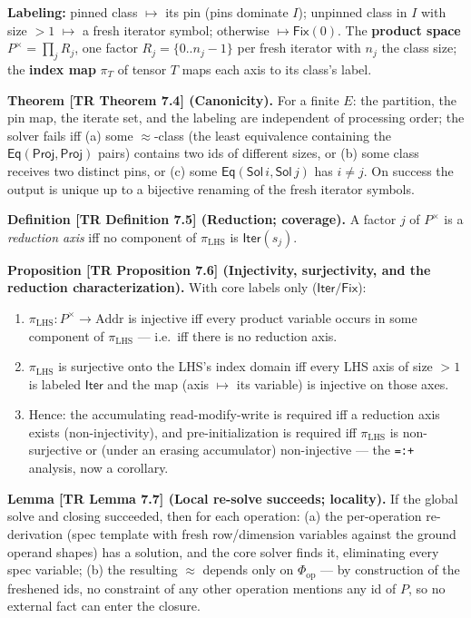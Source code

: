 \documentclass[
  10pt,
  letterpaper,
]{article}
\newcommand{\passthrough}[1]{#1}
\begin{document}
\textbf{Labeling:} pinned class \(\mapsto\) its pin (pins dominate
\(I\)); unpinned class in \(I\) with size \(> 1\) \(\mapsto\) a fresh
iterator symbol; otherwise \(\mapsto \mathsf{Fix}(0)\). The
\textbf{product space} \(P^{\times} = \prod_j R_j\), one factor
\(R_j = \{0..n_j{-}1\}\) per fresh iterator with \(n_j\) the class size;
the \textbf{index map} \(\pi_T\) of tensor \(T\) maps each axis to its
class's label.

\textbf{Theorem {[}TR Theorem 7.4{]} (Canonicity).} For a finite \(E\):
the partition, the pin map, the iterate set, and the labeling are
independent of processing order; the solver fails iff (a) some
\(\approx\)-class (the least equivalence containing the
\(\mathsf{Eq}(\mathsf{Proj},\mathsf{Proj})\) pairs) contains two ids of
different sizes, or (b) some class receives two distinct pins, or (c)
some \(\mathsf{Eq}(\mathsf{Sol}\,i, \mathsf{Sol}\,j)\) has \(i \ne j\).
On success the output is unique up to a bijective renaming of the fresh
iterator symbols.

\textbf{Definition {[}TR Definition 7.5{]} (Reduction; coverage).} A
factor \(j\) of \(P^\times\) is a \emph{reduction axis} iff no component
of \(\pi_{\mathrm{LHS}}\) is \(\mathsf{Iter}(s_j)\).

\textbf{Proposition {[}TR Proposition 7.6{]} (Injectivity, surjectivity,
and the reduction characterization).} With core labels only
(\(\mathsf{Iter}/\mathsf{Fix}\)):

\begin{enumerate}
\def\labelenumi{(\roman{enumi})}
\item
  \(\pi_{\mathrm{LHS}} : P^\times \to \mathrm{Addr}\) is injective iff
  every product variable occurs in some component of
  \(\pi_{\mathrm{LHS}}\) --- i.e.~iff there is no reduction axis.
\item
  \(\pi_{\mathrm{LHS}}\) is surjective onto the LHS's index domain iff
  every LHS axis of size \(> 1\) is labeled \(\mathsf{Iter}\) and the
  map (axis \(\mapsto\) its variable) is injective on those axes.
\item
  Hence: the accumulating read-modify-write is required iff a reduction
  axis exists (non-injectivity), and pre-initialization is required iff
  \(\pi_{\mathrm{LHS}}\) is non-surjective or (under an erasing
  accumulator) non-injective --- the \passthrough{\lstinline!=:+!}
  analysis, now a corollary.
\end{enumerate}

\textbf{Lemma {[}TR Lemma 7.7{]} (Local re-solve succeeds; locality).}
If the global solve and closing succeeded, then for each operation: (a)
the per-operation re-derivation (spec template with fresh row/dimension
variables against the ground operand shapes) has a solution, and the
core solver finds it, eliminating every spec variable; (b) the resulting
\(\approx\) depends only on \(\Phi_{\mathrm{op}}\) --- by construction
of the freshened ids, no constraint of any other operation mentions any
id of \(P\), so no external fact can enter the closure.
\end{document}
